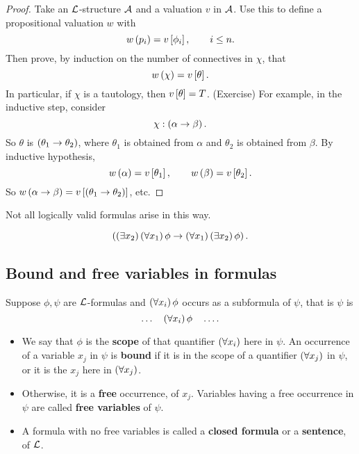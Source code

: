 
\begin{proof}
Take an $ \LL $-structure $ \AA $ and a valuation $ v $ in $ \AA $. Use this to define a propositional valuation $ w $ with
$$ w\rb{p_i} = v\sb{\phi_i}, \qquad i \le n. $$
Then prove, by induction on the number of connectives in $ \chi $, that
$$ w\rb{\chi} = v\sb{\theta}. $$
In particular, if $ \chi $ is a tautology, then $ v\sb{\theta} = T $. (Exercise) For example, in the inductive step, consider
$$ \chi : \impb{\alpha}{\beta}. $$
So $ \theta $ is $ \impb{\theta_1}{\theta_2} $, where $ \theta_1 $ is obtained from $ \alpha $ and $ \theta_2 $ is obtained from $ \beta $. By inductive hypothesis,
$$ w\rb{\alpha} = v\sb{\theta_1}, \qquad w\rb{\beta} = v\sb{\theta_2}. $$
So $ w\impb{\alpha}{\beta} = v\sb{\impb{\theta_1}{\theta_2}} $, etc.
\end{proof}

\begin{note}
Not all logically valid formulas arise in this way.
\end{note}

\begin{example2}
$$ \impb{\teb{x_2}\fab{x_1}\phi}{\fab{x_1}\teb{x_2}\phi}. $$
\end{example2}

\pagebreak

\subsection{Bound and free variables in formulas}

\begin{definition}
Suppose $ \phi, \psi $ are $ \LL $-formulas and $ \fab{x_i}\phi $ occurs as a subformula of $ \psi $, that is $ \psi $ is
$$ \dots \quad \fab{x_i}\phi \quad \dots. $$
\begin{itemize}
\item We say that $ \phi $ is the \textbf{scope} of that quantifier $ \fab{x_i} $ here in $ \psi $. An occurrence of a variable $ x_j $ in $ \psi $ is \textbf{bound} if it is in the scope of a quantifier $ \fab{x_j} $ in $ \psi $, or it is the $ x_j $ here in $ \fab{x_j} $.
\item Otherwise, it is a \textbf{free} occurrence, of $ x_j $. Variables having a free occurrence in $ \psi $ are called \textbf{free variables} of $ \psi $.
\item A formula with no free variables is called a \textbf{closed formula} or a \textbf{sentence}, of $ \LL $.
\end{itemize}
\end{definition}

